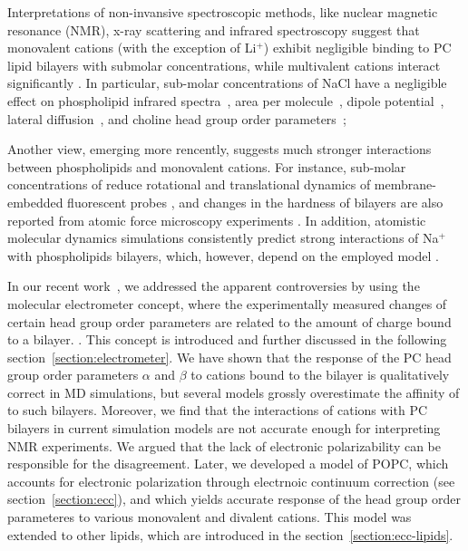 Interpretations of non-invansive spectroscopic methods, like nuclear magnetic resonance (NMR), 
x-ray scattering and infrared spectroscopy suggest that monovalent cations (with the exception of Li$^+$) 
exhibit negligible binding to PC lipid bilayers with submolar concentrations, 
while multivalent cations interact significantly 
\citep{cevc90,tocanne90, hauser76,hauser78,herbette84,altenbach84,uhrikova08}.
In particular, sub-molar concentrations of NaCl have a negligible effect on
phospholipid infrared spectra~\citep{binder02},
area per molecule~\citep{pabst07},
dipole potential~\citep{clarke99},
lateral diffusion~\citep{filippov09},
and choline head group order parameters~\citep{akutsu81};

Another view, emerging more rencently, suggests much stronger interactions between phospholipids and monovalent cations. 
For instance, sub-molar concentrations of  reduce rotational and translational dynamics of membrane-embedded fluorescent probes \citep{bockmann03,vacha09a,harb13}, 
and changes in the hardness of bilayers are also reported from atomic force microscopy experiments \citep{manyes05,manyes06,fukuma07,ferber11,morata12}.
In addition, atomistic molecular dynamics simulations consistently predict strong interactions of Na${^+}$ with phospholipids bilayers,
which, however, depend on the employed model \citep{bockmann03,bockmann04,sachs04,berkowitz06,cordomi08,cordomi09,valley11,berkowitz12}.

In our recent work~\citep{catte16}, we addressed the apparent controversies 
by using the molecular electrometer concept, 
where the experimentally measured changes of certain head group order parameters 
are related to the amount of charge bound to a bilayer. \citep{brown77,akutsu81,altenbach84,seelig87,scherer89}.
This concept is introduced and further discussed in the following section~\ref{section:electrometer}. 
We have shown that the response of the PC head group order parameters $\alpha$ and $\beta$ 
to cations bound to the bilayer is qualitatively correct in MD simulations, 
but several models grossly overestimate the affinity of  to such bilayers. 
Moreover, we find that the interactions of  cations with PC bilayers
in current simulation models are not accurate enough for interpreting NMR experiments. 
We argued that the lack of electronic polarizability can be responsible for the disagreement. 
Later, we developed a model of POPC, 
which accounts for electronic polarization through electrnoic continuum correction (see section~\ref{section:ecc}), 
and which yields accurate response of the head group order parameteres to various monovalent and divalent cations. \citep{melcr18}
This model was extended to other lipids, which are introduced in the section~\ref{section:ecc-lipids}. 







